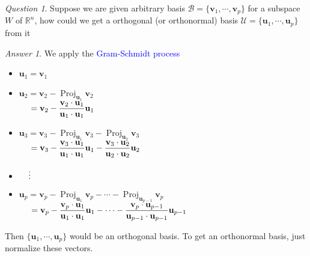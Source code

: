 \documentclass{beamer}
\DeclareMathOperator{\Proj}{Proj}
\theoremstyle{definition}
\theoremstyle{remark}
\newtheorem*{question}{Question}
\newtheorem*{answer}{Answer}
\begin{document}
\begin{frame}[t]
\begin{question}
Suppose we are given arbitrary basis $\mathcal B=\{\mathbf v_1,\cdots,\mathbf v_p\}$ for a subspace $W$ of $\mathbb R^n$, how could we get a orthogonal (or orthonormal) basis $\mathcal U=\{\mathbf u_1,\cdots,\mathbf u_p\}$ from it
\end{question}
\end{frame}

\begin{frame}[t]
\begin{answer}
We apply the \textcolor{blue}{Gram-Schmidt process}\pause
\begin{itemize}
\item $\mathbf u_1=\mathbf v_1$\pause
\item $\mathbf u_2=\mathbf v_2-\Proj_{\mathbf u_1}\mathbf v_2$\\
$\hphantom{\mathbf u_2}=\mathbf v_2-\dfrac{\mathbf v_2\cdot\mathbf u_1}{\mathbf u_1\cdot\mathbf u_1}\mathbf u_1$\pause
\item $\mathbf u_3=\mathbf v_3-\Proj_{\mathbf u_1}\mathbf v_3-\Proj_{\mathbf u_2}\mathbf v_3$\\
$\hphantom{\mathbf u_3}=\mathbf v_3-\dfrac{\mathbf v_3\cdot\mathbf u_1}{\mathbf u_1\cdot\mathbf u_1}\mathbf u_1-\dfrac{\mathbf v_3\cdot\mathbf u_2}{\mathbf u_2\cdot\mathbf u_2}\mathbf u_2$\pause
\item $\hphantom{\mathbf u_4}\vdots$
\item $\mathbf u_p=\mathbf v_p-\Proj_{\mathbf u_1}\mathbf v_p-\cdots-\Proj_{\mathbf u_{p-1}}\mathbf v_p$\\
$\hphantom{\mathbf u_p}=\mathbf v_p-\dfrac{\mathbf v_p\cdot\mathbf u_1}{\mathbf u_1\cdot\mathbf u_1}\mathbf u_1-\cdots-\dfrac{\mathbf v_p\cdot\mathbf u_{p-1}}{\mathbf u_{p-1}\cdot\mathbf u_{p-1}}\mathbf u_{p-1}$\pause
\end{itemize}
Then $\{\mathbf u_1,\cdots,\mathbf u_p\}$ would be an orthogonal basis\pause. To get an orthonormal basis, just normalize these vectors.
\end{answer}
\end{frame}
\end{document}
